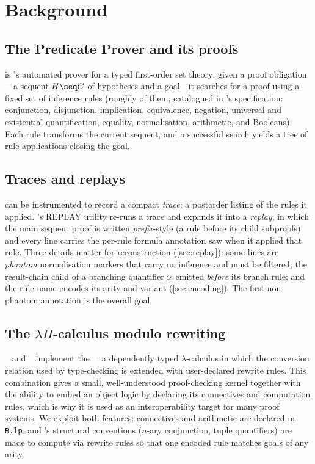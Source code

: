 \section{Background}\label{sec:background}

\subsection{The Predicate Prover and its proofs}
\pp{} is \ab's automated prover for a typed first-order set theory: given a
proof obligation---a sequent \(H \seq G\) of hypotheses and a goal---it
searches for a proof using a fixed set of inference rules (roughly
\numRulesSpec{} of them, catalogued in \pp's specification: conjunction,
disjunction, implication, equivalence, negation, universal and
existential quantification, equality, normalisation, arithmetic, and
Booleans). Each rule transforms the current sequent, and a successful
search yields a tree of rule applications closing the goal.

\subsection{Traces and replays}\label{sec:replay-format}
\pp{} can be instrumented to record a compact \emph{trace}: a postorder
listing of the rules it applied. \ab's REPLAY utility re-runs a trace and
expands it into a \emph{replay}, in which the main sequent proof is written
\emph{prefix}-style (a rule before its child subproofs) and every line
carries the per-rule formula annotation \pp{} saw when it applied that
rule. Three details matter for reconstruction
(\autoref{sec:replay}): some lines are \emph{phantom} normalisation
markers that carry no inference and must be filtered; the result-chain
child of a branching quantifier is emitted \emph{before} its branch rule;
and the rule name encodes its arity and variant
(\autoref{sec:encoding}). The first non-phantom annotation is the overall
goal.

\subsection{The \texorpdfstring{$\lambda\Pi$}{lambda-Pi}-calculus modulo rewriting}
\lp~\cite{hondet:hal-02981561} and \dedukti~\cite{assaf2023dedukti}
implement the \lpcmr~\cite{CousineauDowek}: a dependently typed
\(\lambda\)-calculus in which the conversion relation used by type-checking
is extended with user-declared rewrite rules. This combination gives a
small, well-understood proof-checking kernel together with the ability to
embed an object logic by declaring its connectives and computation rules,
which is why it is used as an interoperability target for many proof
systems. We exploit both features: \bbook{} connectives and arithmetic are
declared in \texttt{B.lp}, and \pp's structural conventions (\(n\)-ary
conjunction, tuple quantifiers) are made to compute via rewrite rules so
that one encoded rule matches goals of any arity.
